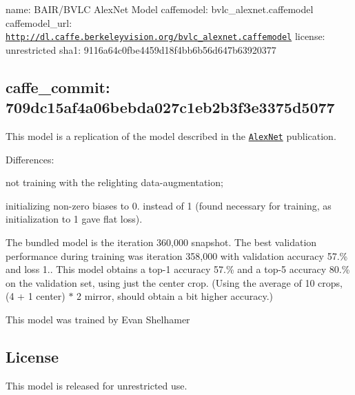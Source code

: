 

 name\+: B\+A\+I\+R/\+B\+V\+LC Alex\+Net Model caffemodel\+: bvlc\+\_\+alexnet.\+caffemodel caffemodel\+\_\+url\+: \href{http://dl.caffe.berkeleyvision.org/bvlc_alexnet.caffemodel}{\tt http\+://dl.\+caffe.\+berkeleyvision.\+org/bvlc\+\_\+alexnet.\+caffemodel} license\+: unrestricted sha1\+: 9116a64c0fbe4459d18f4bb6b56d647b63920377 \subsection*{caffe\+\_\+commit\+: 709dc15af4a06bebda027c1eb2b3f3e3375d5077 }

This model is a replication of the model described in the \href{http://papers.nips.cc/paper/4824-imagenet-classification-with-deep-convolutional-neural-networks}{\tt Alex\+Net} publication.

Differences\+:
\begin{DoxyItemize}
\item not training with the relighting data-\/augmentation;
\item initializing non-\/zero biases to 0. instead of 1 (found necessary for training, as initialization to 1 gave flat loss).
\end{DoxyItemize}

The bundled model is the iteration 360,000 snapshot. The best validation performance during training was iteration 358,000 with validation accuracy 57.\% and loss 1.. This model obtains a top-\/1 accuracy 57.\% and a top-\/5 accuracy 80.\% on the validation set, using just the center crop. (Using the average of 10 crops, (4 + 1 center) $\ast$ 2 mirror, should obtain a bit higher accuracy.)

This model was trained by Evan Shelhamer 

\subsection*{License}

This model is released for unrestricted use. 